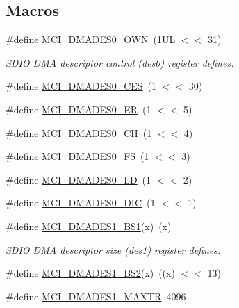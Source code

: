 \subsection*{Macros}
\begin{DoxyCompactItemize}
\item 
\#define \hyperlink{group___s_d_i_f__18_x_x__43_x_x_ga9cc0b616dabdfa17ca7704ec10a9a07e}{M\+C\+I\+\_\+\+D\+M\+A\+D\+E\+S0\+\_\+\+O\+WN}~(1\+U\+L $<$$<$ 31)
\begin{DoxyCompactList}\small\item\em S\+D\+IO D\+MA descriptor control (des0) register defines. \end{DoxyCompactList}\item 
\#define \hyperlink{group___s_d_i_f__18_x_x__43_x_x_ga16e7ffceb4d58ef4e433ce058db1d329}{M\+C\+I\+\_\+\+D\+M\+A\+D\+E\+S0\+\_\+\+C\+ES}~(1 $<$$<$ 30)
\item 
\#define \hyperlink{group___s_d_i_f__18_x_x__43_x_x_ga920a3926448243313844e17ebcb0772c}{M\+C\+I\+\_\+\+D\+M\+A\+D\+E\+S0\+\_\+\+ER}~(1 $<$$<$ 5)
\item 
\#define \hyperlink{group___s_d_i_f__18_x_x__43_x_x_ga855ace5f638d58dbf22869f5e426e4a5}{M\+C\+I\+\_\+\+D\+M\+A\+D\+E\+S0\+\_\+\+CH}~(1 $<$$<$ 4)
\item 
\#define \hyperlink{group___s_d_i_f__18_x_x__43_x_x_ga1426783aaf334b21e15bce736b437931}{M\+C\+I\+\_\+\+D\+M\+A\+D\+E\+S0\+\_\+\+FS}~(1 $<$$<$ 3)
\item 
\#define \hyperlink{group___s_d_i_f__18_x_x__43_x_x_gaf8d86743fcf4c31aba0848da452b9b40}{M\+C\+I\+\_\+\+D\+M\+A\+D\+E\+S0\+\_\+\+LD}~(1 $<$$<$ 2)
\item 
\#define \hyperlink{group___s_d_i_f__18_x_x__43_x_x_gad22ff199990d9e28bd0ac6aa6795f21e}{M\+C\+I\+\_\+\+D\+M\+A\+D\+E\+S0\+\_\+\+D\+IC}~(1 $<$$<$ 1)
\item 
\#define \hyperlink{group___s_d_i_f__18_x_x__43_x_x_ga22d324f9117ca732493b9c50e988de37}{M\+C\+I\+\_\+\+D\+M\+A\+D\+E\+S1\+\_\+\+B\+S1}(x)~(x)
\begin{DoxyCompactList}\small\item\em S\+D\+IO D\+MA descriptor size (des1) register defines. \end{DoxyCompactList}\item 
\#define \hyperlink{group___s_d_i_f__18_x_x__43_x_x_ga4062b6adc0b58f501634352fd38760c1}{M\+C\+I\+\_\+\+D\+M\+A\+D\+E\+S1\+\_\+\+B\+S2}(x)~((x) $<$$<$ 13)
\item 
\#define \hyperlink{group___s_d_i_f__18_x_x__43_x_x_gaa57e923a4321476b1b67ecd076e053a7}{M\+C\+I\+\_\+\+D\+M\+A\+D\+E\+S1\+\_\+\+M\+A\+X\+TR}~4096

\end{DoxyCompactItemize}
